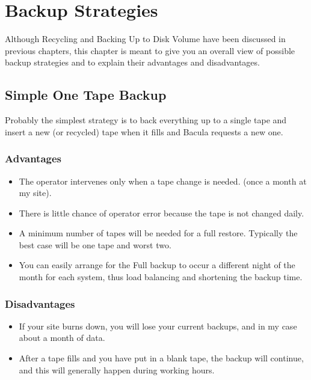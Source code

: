 
\chapter{Backup Strategies}
\label{StrategiesChapter}

Although Recycling and Backing Up to Disk Volume have been discussed in
previous chapters, this chapter is meant to give you an overall view of
possible backup strategies and to explain their advantages and disadvantages. 
\label{Simple}

\section{Simple One Tape Backup}

Probably the simplest strategy is to back everything up to a single tape and
insert a new (or recycled) tape when it fills and Bacula requests a new one. 

\subsection{Advantages}

\begin{itemize}
\item The operator intervenes only when a tape change is needed.  (once a
   month at my site).  
\item There is little chance of operator error because the tape  is not
   changed daily.  
\item A minimum number of tapes will be needed for a full restore.  Typically
   the best case will be one tape and worst two.  
\item You can easily arrange for the Full backup to occur a different  night
   of the month for each system, thus load balancing and  shortening the backup
   time. 
\end{itemize}

\subsection{Disadvantages}

\begin{itemize}
\item If your site burns down, you will lose your current backups,  and in my
   case about a month of data.  
\item After a tape fills and you have put in a blank tape, the  backup will
   continue, and this will generally happen during  working hours. 
   \end{itemize}

